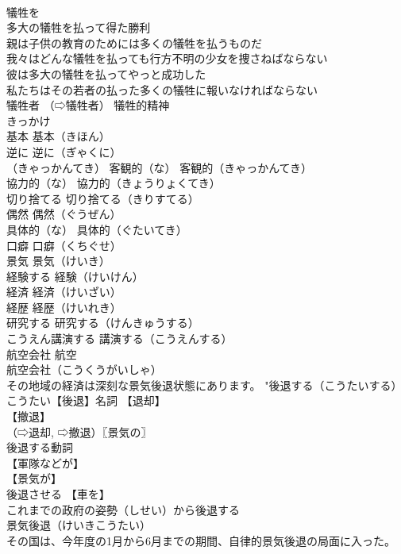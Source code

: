 \documentclass[8pt]{extreport}
\begin{document}
\begin{CJK}{UTF8}{min}
\\	犠牲を 
\\	多大の犠牲を払って得た勝利 
\\	親は子供の教育のためには多くの犠牲を払うものだ 
\\	我々はどんな犠牲を払っても行方不明の少女を捜さねばならない 
\\	彼は多大の犠牲を払ってやっと成功した 
\\	私たちはその若者の払った多くの犠牲に報いなければならない 
\\	犠牲者 （⇨犠牲者） 犠牲的精神 
\\	きっかけ		
\\	基本		基本（きほん） 
\\	逆に		逆に（ぎゃくに） 
\\	（きゃっかんてき） 客観的（な）		客観的（きゃっかんてき） 
\\	協力的（な）		協力的（きょうりょくてき） 
\\	切り捨てる		切り捨てる（きりすてる） 
\\	偶然		偶然（ぐうぜん） 
\\	具体的（な）		具体的（ぐたいてき） 
\\	口癖		口癖（くちぐせ） 
\\	景気		景気（けいき） 
\\	経験する		経験（けいけん） 
\\	経済		経済（けいざい） 
\\	経歴		経歴（けいれき） 
\\	研究する		研究する（けんきゅうする） 
\\	こうえん講演する		講演する（こうえんする） 
\\	航空会社		航空 
\\	航空会社（こうくうがいしゃ） 
\\	その地域の経済は深刻な景気後退状態にあります。		"後退する（こうたいする） 
\\	こうたい【後退】名詞 【退却】
\\	【撤退】
\\	（⇨退却, ⇨撤退）〖景気の〗
\\	後退する動詞 
\\	【軍隊などが】
\\	【景気が】
\\	後退させる 【車を】
\\	これまでの政府の姿勢（しせい）から後退する 
\\	景気後退（けいきこうたい） 
\\	その国は、今年度の1月から6月までの期間、自律的景気後退の局面に入った。 

\end{CJK}
\end{document}
